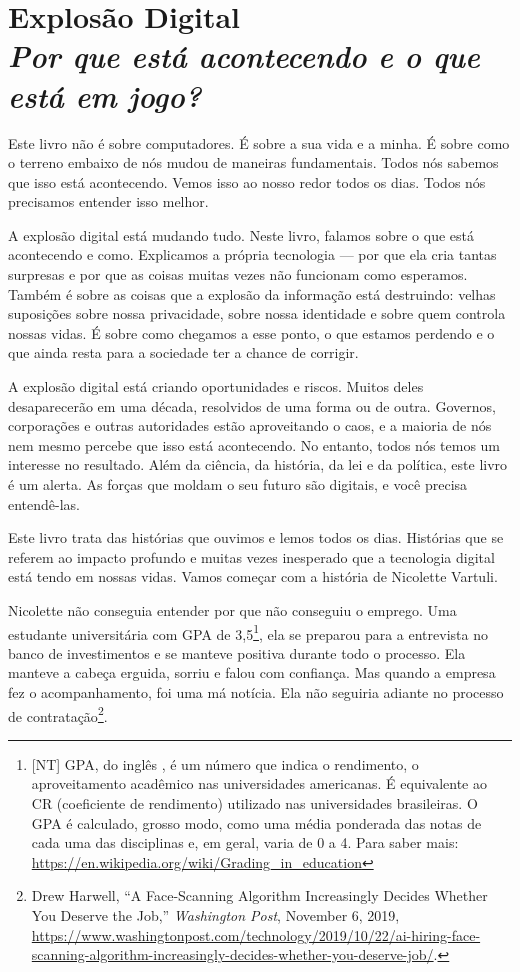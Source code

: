 \chapter[Explosão Digital]{Explosão Digital\\\large\textit{Por que está
acontecendo e o que está em jogo?}}
\label{cap1:exp-dig}

Este livro não é sobre computadores. É sobre a sua vida e a minha. É sobre como
o terreno embaixo de nós mudou de maneiras fundamentais. Todos nós sabemos que
isso está acontecendo. Vemos isso ao nosso redor todos os dias. Todos nós
precisamos entender isso melhor.

A explosão digital está mudando tudo. Neste livro, falamos sobre o que está
acontecendo e como. Explicamos a própria tecnologia --- por que ela cria tantas 
surpresas e por que as coisas muitas vezes não funcionam como esperamos. Também 
é sobre as coisas que a explosão da informação está destruindo: velhas 
suposições sobre nossa privacidade, sobre nossa identidade e sobre quem controla
nossas vidas. É sobre como chegamos a esse ponto, o que estamos perdendo e o que
ainda resta para a sociedade ter a chance de corrigir.

A explosão digital está criando oportunidades e riscos. Muitos deles 
desaparecerão em uma década, resolvidos de uma forma ou de outra. Governos, 
corporações e outras autoridades estão aproveitando o caos, e a maioria de nós 
nem mesmo percebe que isso está acontecendo. No entanto, todos nós temos um 
interesse no resultado. Além da ciência, da história, da lei e da política, este
livro é um alerta. As forças que moldam o seu futuro são digitais, e você 
precisa entendê-las.

Este livro trata das histórias que ouvimos e lemos todos os dias. Histórias que 
se referem ao impacto profundo e muitas vezes inesperado que a tecnologia 
digital está tendo em nossas vidas. Vamos começar com a história de Nicolette 
Vartuli.

Nicolette não conseguia entender por que não conseguiu o emprego. Uma estudante 
universitária com GPA de 3,5\footnote{[NT] GPA, do inglês , é um número que indica o rendimento, o aproveitamento acadêmico nas
universidades americanas. É equivalente ao CR (coeficiente de rendimento)
utilizado nas universidades brasileiras. O GPA é calculado, grosso modo, como
uma média ponderada das notas de cada uma das disciplinas e, em geral, varia de
0 a 4. Para saber mais: \url{https://en.wikipedia.org/wiki/Grading_in_education}},
ela se preparou para a entrevista no banco de  investimentos e se manteve
positiva durante todo o processo. Ela manteve a cabeça erguida, sorriu e falou
com confiança. Mas quando a empresa fez o acompanhamento, foi uma má notícia.
Ela não seguiria adiante no processo de contratação\footnote{Drew Harwell, ``A
Face-Scanning Algorithm Increasingly Decides Whether You Deserve the Job,''
\textit{Washington Post}, November 6, 2019, \url{https://www.washingtonpost.com/technology/2019/10/22/ai-hiring-face-scanning-algorithm-increasingly-decides-whether-you-deserve-job/}.}.

